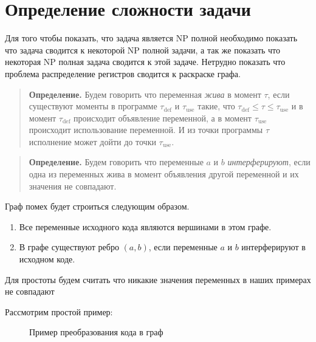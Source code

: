 \documentclass[12pt]{article}
\begin{document}
\section{Определение сложности задачи}
\label{seg:complexity}
Для того чтобы показать, что задача является NP полной необходимо показать что задача сводится к
некоторой NP полной задачи, а так же показать что некоторая NP полная задача сводится к этой
задаче. Нетрудно показать что проблема распределение регистров сводится к раскраске графа.

\begin{quote}
    \textbf{Определение.}
    Будем говорить что переменная \textit{жива} в момент $\tau$, если существуют моменты в программе $\tau_{\text{def}}$ и
    $\tau_{\text{use}}$ такие, что $\tau_{\text{def}} \leq \tau \leq \tau_{\text{use}}$ и в момент $\tau_{\text{def}}$ происходит
    объявление переменной, а в момент $\tau_{\text{use}}$ происходит использование переменной. И из точки программы $\tau$
    исполнение может дойти до точки $\tau_{\text{use}}$.
\end{quote}

\begin{quote}
    \textbf{Определение.}
    Будем говорить что переменные $a$ и $b$ \textit{интерферируют}, если одна из переменных жива в момент объявления
    другой переменной и их значения не совпадают.
\end{quote}

Граф помех будет строиться следующим образом.
\begin{enumerate}
    \item Все переменные исходного кода являются вершинами в этом графе.
    \item В графе существуют ребро $(a, b)$, если переменные $a$ и $b$ интерферируют в исходном коде.
\end{enumerate}

Для простоты будем считать что никакие значения переменных в наших примерах не совпадают

Рассмотрим простой пример:
\begin{figure}[H]
    \centering
\caption{Пример преобразования кода в граф}
\label{fig:ex1}
\end{figure}
\end{document}
